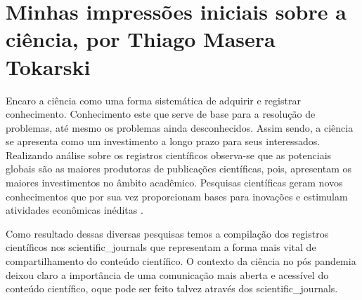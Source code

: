 \section{Minhas impressões iniciais sobre a ciência, por Thiago Masera Tokarski}

Encaro a ciência como uma forma sistemática de adquirir e registrar conhecimento. Conhecimento este que serve de base para a resolução de problemas, até mesmo os problemas ainda desconhecidos. Assim sendo, a ciência se apresenta como um investimento a longo prazo para seus interessados. Realizando análise sobre os registros científicos observa-se que as potenciais globais são as maiores produtoras de publicações científicas, pois, apresentam os maiores investimentos no âmbito acadêmico. Pesquisas científicas geram novos conhecimentos que por sua vez proporcionam bases para inovações e estimulam atividades econômicas inéditas \cite{ost_dynamics_2019}. 

Como resultado dessas diversas pesquisas temos a compilação dos registros científicos nos \gls{scientific_journals} que representam a forma mais vital de compartilhamento do conteúdo científico. O contexto da ciência no pós pandemia deixou claro a importância de uma comunicação mais aberta e acessível do conteúdo científico, oque pode ser feito talvez através dos \gls{scientific_journals}.

